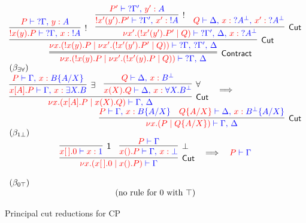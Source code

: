 \begin{figure*}
\[\begin{array}{c}
\hfill
\vcenter{
  \Inference{
    \inference{
      \inference{
        \tm{P} \tpvdash \tp{{?\Gamma} \comma \tmof{y}A}
      }{!}{
        \tm{!x(y).P} \tpvdash \tp{{?\Gamma} \comma \tmof{x}{!A}}
      }
      &
      \inference{
        \inference{
          \tm{P'} \tpvdash \tp{{?\Gamma'} \comma \tmof{y'}A}
        }{!}{
          \tm{!x'(y').P'} \tpvdash \tp{{?\Gamma'} \comma \tmof{x'}{!A}}
        }
        &
        \tm{Q} \tpvdash \tp{\Delta \comma \tmof{x}{?\dualbt{A}}
                                  \comma \tmof{x'}{?\dualbt{A}}}
      }{Cut}{
        \tm{\nu x'\Of{!A}.(!x'(y').P' \mid Q)}
          \tpvdash \tp{{?\Gamma'} \comma \Delta \comma \tmof{x}{?\dualbt{A}}}
      }
    }{Cut}{
      \tm{\nu x\Of{!A}.(!x(y).P \mid \nu x'\Of{!A}.(!x'(y').P' \mid Q))}
        \tpvdash \tp{{?\Gamma} \comma {?\Gamma'} \comma \Delta}
    }
  }{Contract}{
    \tm{\nu x\Of{!A}.(!x(y).P \mid \nu x'\Of{!A}.(!x'(y).P \mid Q))}
      \tpvdash \tp{{?\Gamma} \comma \Delta}
  }
}
\\
\multicolumn{1}{l}{(\beta_{\exists\forall})} \\ %
\vcenter{
  \inference{
    \inference{
      \tm{P} \tpvdash \tp{\Gamma \comma \tmof{x}B\sub{A/X}}
    }{\exists}{
      \tm{x[A].P} \tpvdash \tp{\Gamma \comma \tmof{x}\any{X}B}
    } 
    &
    \inference{
      \tm{Q} \tpvdash \tp{\Delta \comma \tmof{x}\dualbt{B}}
    }{\forall}{
      \tm{x(X).Q} \tpvdash \tp{\Delta \comma \tmof{x}\all{X}\dualbt{B}}
    } 
  }{Cut}{
   \tm{\nu x \Of{\any{X}B}.(x[A].P \mid x(X).Q)} \tpvdash
     \tp{\Gamma \comma \Delta}
  }
} \quad \becomes \hfill
\\
\hfill
\vcenter{
  \inference{
    \tm{P} \tpvdash \tp{\Gamma \comma \tmof{x}B\sub{A/X}}
    &
    \tm{Q\sub{A/X}} \tpvdash \tp{\Delta \comma \tmof{x}\dualbt{B}\sub{A/X}}
  }{Cut}{
    \tm{\nu x \Of{B\sub{A/X}}.(P \mid Q\sub{A/X})} \tpvdash
      \tp{\Gamma \comma \Delta}
  }
}
\\
\multicolumn{1}{l}{(\beta_{1\bot})} \\ %
\vcenter{\inference{
  \inference{}{1}{
    \tm{x[\,].0} \tpvdash \tp{\tmof{x}1}
  }
  &
  \inference{
    \tm{P} \tpvdash \tp{\Gamma}
  }{\bot}{
    \tm{x().P} \tpvdash \tp{\Gamma \comma \tmof{x}\bot}
  } 
}{Cut}{
  \tm{\nu x\Of{1}.(x[\,].0 \mid x().P)} \tpvdash \tp{\Gamma}
}}
\quad \becomes \quad
\tm{P} \tpvdash \tp{\Gamma}
\\~\\
\multicolumn{1}{l}{(\beta_{0\top})} \\%
\textrm{(no rule for $0$ with $\top$)}
\end{array}\]
\caption{Principal cut reductions for CP}
\label{fig:principal}
\end{figure*}
